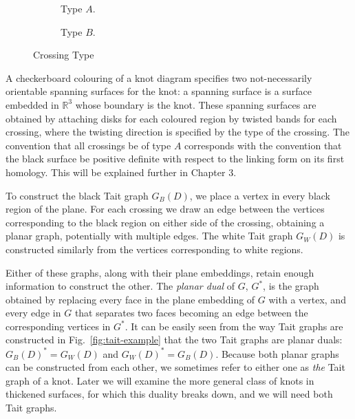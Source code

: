 \documentclass[12pt]{report}
\newcommand{\R}{\mathbb{R}}
\theoremstyle{upright}
\begin{document}
\begin{figure}[hbt]
	\centering
	\hspace*{\fill}
	\begin{subfigure}[b]{0.4 \textwidth}
		\centering
		\def\svgscale{0.28}
		
		\caption{Type $A$.}
		\label{fig:type-a}
	\end{subfigure}
	\hspace*{\fill} \hspace*{\fill}	\hspace*{\fill}
	\begin{subfigure}[b]{0.4 \textwidth}
		\centering
		\def\svgscale{0.28}
		
		\caption{Type $B$.}
		\label{fig:type-b}
	\end{subfigure}
	\hspace*{\fill} 
	\caption{Crossing Type}
	\label{fig:crossing-type}
\end{figure}


A checkerboard colouring of a knot diagram specifies two not-necessarily orientable spanning surfaces for the knot: a spanning surface is a surface embedded in $\R^{3}$ whose boundary is the knot. These spanning surfaces are obtained by attaching disks for each coloured region by twisted bands for each crossing, where the twisting direction is specified by the type of the crossing. The convention that all crossings be of type $A$ corresponds with the convention that the black surface be positive definite with respect to the linking form on its first homology. This will be explained further in Chapter 3.

To construct the black Tait graph $G_{B}(D)$, we place a vertex in every black region of the plane. For each crossing we draw an edge between the vertices corresponding to the black region on either side of the crossing, obtaining a planar graph, potentially with multiple edges. The white Tait graph $G_{W}(D)$ is constructed similarly from the vertices corresponding to white regions.

Either of these graphs, along with their plane embeddings, retain enough information to construct the other. The \textit{planar dual} of $G$, $G^{*}$, is the graph obtained by replacing every face in the plane embedding of $G$ with a vertex, and every edge in $G$ that separates two faces becoming an edge between the corresponding vertices in $G^{*}$. It can be easily seen from the way Tait graphs are constructed in Fig.~\ref{fig:tait-example} that the two Tait graphs are planar duals: $G_{B}(D)^{*} = G_{W}(D)$ and $G_{W}(D)^{*} = G_{B}(D)$. Because both planar graphs can be constructed from each other, we sometimes refer to either one as \textit{the} Tait graph of a knot. Later we will examine the more general class of knots in thickened surfaces, for which this duality breaks down, and we will need both Tait graphs.
\end{document}

